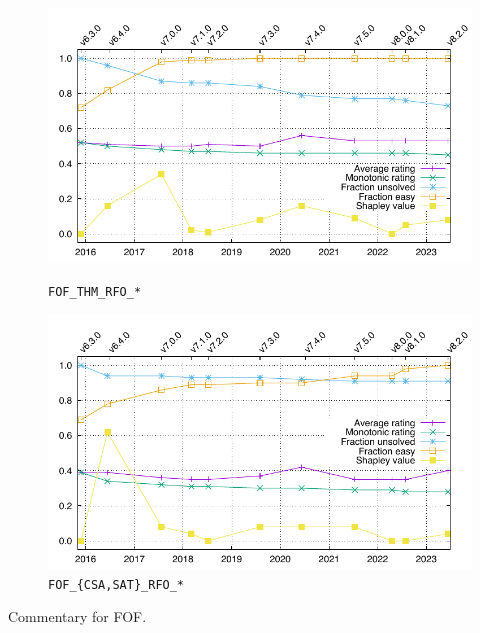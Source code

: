 \documentclass[runningheads]{llncs}
\begin{document}
\begin{figure}[ht!]
\centering
\begin{minipage}[t]{.49\textwidth}
  \centering
  \includegraphics[width=\textwidth]{Plots/GNUPlots/FOF_THM_RFO.pdf}
  \vspace*{-2em}
  \caption{{\tt FOF\_THM\_RFO\_*}}
  \label{Plot_FOF_THM}
\end{minipage}
\begin{minipage}[t]{.49\textwidth}
  \centering
  \includegraphics[width=\textwidth]{Plots/GNUPlots/FOF_CSA_SAT_RFO.pdf}
  \vspace*{-2em}
  \caption{{\tt FOF\_\{CSA,SAT\}\_RFO\_*}}
  \label{Plot_FOF_SAT}
\end{minipage}
\end{figure}

Commentary for FOF.
\end{document}
